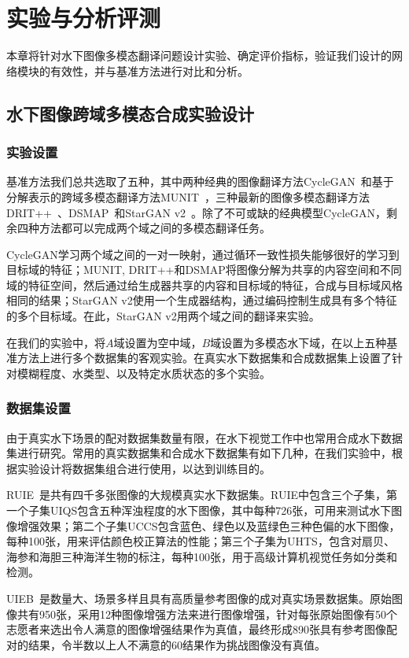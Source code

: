 \chapter{实验与分析评测}
本章将针对水下图像多模态翻译问题设计实验、确定评价指标，验证我们设计的网络模块的有效性，并与基准方法进行对比和分析。

\section{水下图像跨域多模态合成实验设计}
\subsection{实验设置}
基准方法我们总共选取了五种，其中两种经典的图像翻译方法CycleGAN~\citep{zhu2017unpaired}和基于分解表示的跨域多模态翻译方法MUNIT~\citep{huang2018multimodal}，三种最新的图像多模态翻译方法DRIT++~\citep{lee2020drit++}、DSMAP~\citep{chang2020domain}和StarGAN v2~\cite{choi2020stargan}。除了不可或缺的经典模型CycleGAN，剩余四种方法都可以完成两个域之间的多模态翻译任务。

CycleGAN学习两个域之间的一对一映射，通过循环一致性损失能够很好的学习到目标域的特征；MUNIT, DRIT++和DSMAP将图像分解为共享的内容空间和不同域的特征空间，然后通过给生成器共享的内容和目标域的特征，合成与目标域风格相同的结果；StarGAN v2使用一个生成器结构，通过编码控制生成具有多个特征的多个目标域。在此，StarGAN v2用两个域之间的翻译来实验。

在我们的实验中，将$A$域设置为空中域，$B$域设置为多模态水下域，在以上五种基准方法上进行多个数据集的客观实验。在真实水下数据集和合成数据集上设置了针对模糊程度、水类型、以及特定水质状态的多个实验。

\subsection{数据集设置}
由于真实水下场景的配对数据集数量有限，在水下视觉工作中也常用合成水下数据集进行研究。常用的真实数据集和合成水下数据集有如下几种，在我们实验中，根据实验设计将数据集组合进行使用，以达到训练目的。

RUIE~\cite{liu2019real}是共有四千多张图像的大规模真实水下数据集。RUIE中包含三个子集，第一个子集UIQS包含五种浑浊程度的水下图像，其中每种726张，可用来测试水下图像增强效果；第二个子集UCCS包含蓝色、绿色以及蓝绿色三种色偏的水下图像，每种100张，用来评估颜色校正算法的性能；第三个子集为UHTS，包含对扇贝、海参和海胆三种海洋生物的标注，每种100张，用于高级计算机视觉任务如分类和检测。

UIEB~\cite{li2019underwater}是数量大、场景多样且具有高质量参考图像的成对真实场景数据集。原始图像共有950张，采用12种图像增强方法来进行图像增强，针对每张原始图像有50个志愿者来选出令人满意的图像增强结果作为真值，最终形成890张具有参考图像配对的结果，令半数以上人不满意的60结果作为挑战图像没有真值。

